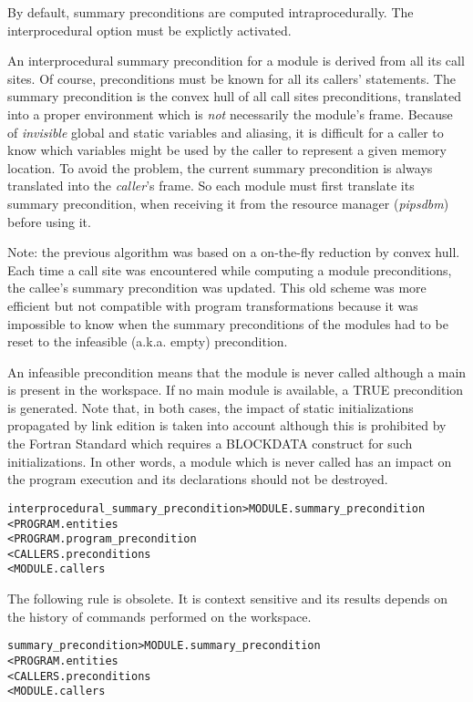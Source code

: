 \documentclass[a4paper]{report}
\newenvironment{PipsMake}{\begin{alltt}}{\end{alltt}}
\begin{document}
By default, summary preconditions are computed intraprocedurally. The
interprocedural option must be explictly activated.

An interprocedural summary precondition for a module is derived from all
its call sites. Of course, preconditions must be known for all its
callers' statements.  The summary precondition is the convex hull of all
call sites preconditions, translated into a proper environment which is
{\em not} necessarily the module's frame. Because of {\em invisible}
global and static variables and aliasing, it is difficult for a caller to
know which variables might be used by the caller to represent a given
memory location. To avoid the problem, the current summary precondition is
always translated into the {\em caller}'s frame. So each module must first
translate its summary precondition, when receiving it from the resource
manager ({\em pipsdbm}) before using it.

Note: the previous algorithm was based on a on-the-fly reduction by
convex hull. Each time a call site was encountered while computing a
module preconditions, the callee's summary precondition was updated. This
old scheme was more efficient but not compatible with program
transformations because it was impossible to know when the summary
preconditions of the modules had to be reset to the infeasible
(a.k.a. empty) precondition.

An infeasible precondition means that the module is never called although
a main is present in the workspace. If no main module is available, a TRUE
precondition is generated. Note that, in both cases, the impact of static
initializations propagated by link edition is taken into account although
this is prohibited by the Fortran Standard which requires a BLOCKDATA
construct for such initializations. In other words, a module which is
never called has an impact on the program execution and its declarations
should not be destroyed.

\begin{PipsMake}
interprocedural_summary_precondition            > MODULE.summary_precondition
        < PROGRAM.entities
        < PROGRAM.program_precondition
        < CALLERS.preconditions
        < MODULE.callers
\end{PipsMake}

The following rule is obsolete. It is context sensitive and its results
depends on the history of commands performed on the workspace.

\begin{PipsMake}
summary_precondition            > MODULE.summary_precondition
        < PROGRAM.entities
        < CALLERS.preconditions
        < MODULE.callers
\end{PipsMake}
\end{document}
